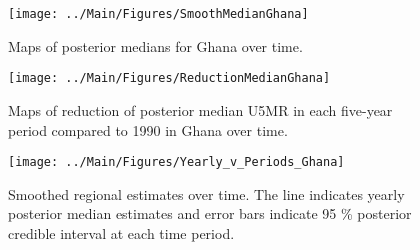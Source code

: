 \documentclass[12pt]{article}\usepackage[]{graphicx}\usepackage[]{color}
\newenvironment{knitrout}{}{} %
\begin{document}
\begin{knitrout}
\color{fgcolor}\begin{figure}[bht]

{\centering \texttt{[image: ../Main/Figures/SmoothMedianGhana]} 

}

\caption[Maps of posterior medians for Ghana  over time]{Maps of posterior medians for Ghana  over time.}\label{fig:unnamed-chunk-144}
\end{figure}


\end{knitrout}
\begin{knitrout}
\color{fgcolor}\begin{figure}[bht]

{\centering \texttt{[image: ../Main/Figures/ReductionMedianGhana]} 

}

\caption[Maps of reduction of posterior median U5MR in each five-year period compared to 1990 in Ghana over time]{Maps of reduction of posterior median U5MR in each five-year period compared to 1990 in Ghana over time.}\label{fig:unnamed-chunk-145}
\end{figure}


\end{knitrout}
\begin{knitrout}
\color{fgcolor}\begin{figure}[bht]

{\centering \texttt{[image: ../Main/Figures/Yearly\_v\_Periods\_Ghana]} 

}

\caption[Smoothed regional estimates over time]{Smoothed regional estimates over time. The line indicates yearly posterior median estimates and error bars indicate 95 \% posterior credible interval at each time period.}\label{fig:unnamed-chunk-146}
\end{figure}


\end{knitrout}
\end{document}
